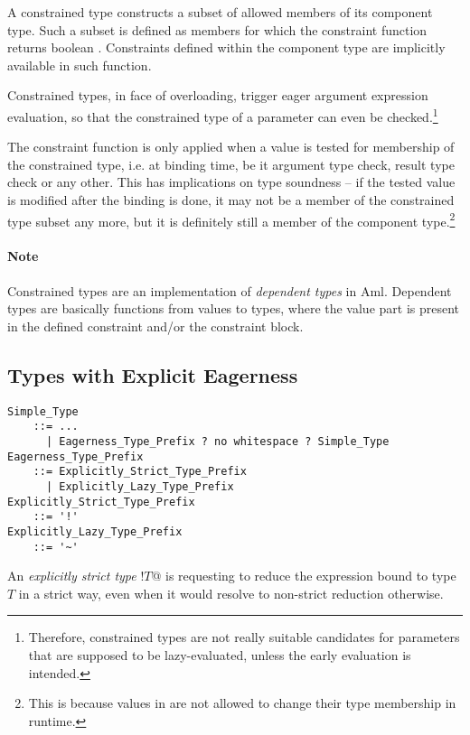 A constrained type constructs a subset of allowed members of its component type. Such a subset is defined as members for which the constraint function returns boolean . Constraints defined within the component type are implicitly available in such function. 

Constrained types, in face of overloading, trigger eager argument expression evaluation, so that the constrained type of a parameter can even be checked.\footnote{Therefore, constrained types are not really suitable candidates for parameters that are supposed to be lazy-evaluated, unless the early evaluation is intended.}

The constraint function is only applied when a value is tested for membership of the constrained type, i.e. at binding time, be it argument type check, result type check or any other. This has implications on type soundness -- if the tested value is modified after the binding is done, it may not be a member of the constrained type subset any more, but it is definitely still a member of the component type.\footnote{This is because values in \Aml are not allowed to change their type membership in runtime.}

\paragraph{Note}
Constrained types are an implementation of {\em dependent types} in Aml. Dependent types are basically functions from values to types, where the value part is present in the defined constraint and/or the constraint block. 





\subsection{Types with Explicit Eagerness}
\label{sec:explicit-eagerness-types}

\grammar\begin{lstlisting}[deletekeywords={no}]
Simple_Type
    ::= ...
      | Eagerness_Type_Prefix ? no whitespace ? Simple_Type
Eagerness_Type_Prefix
    ::= Explicitly_Strict_Type_Prefix
      | Explicitly_Lazy_Type_Prefix
Explicitly_Strict_Type_Prefix
    ::= '!'
Explicitly_Lazy_Type_Prefix
    ::= '~'
\end{lstlisting}

An {\em explicitly strict type} \lstinline@!$T$@ is requesting \Aml to reduce the expression bound to type $T$ in a strict way, even when it would resolve to non-strict reduction otherwise.
 
